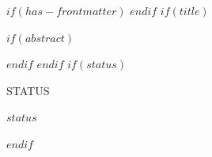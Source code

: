 $if(has-frontmatter)$
\frontmatter
$endif$
$if(title)$
\maketitle
$if(abstract)$
\begin{abstract}
$abstract$
\end{abstract}
$endif$
$endif$
$if(status)$
\par\vspace{0.7em}
\noindent{\color{axiomaccent}\rule{\linewidth}{0.5pt}}\par
\vspace{0.4em}
{\axiommono\fontsize{7}{9}\selectfont STATUS\par}
\vspace{0.25em}
\begingroup\small\sffamily
$status$
\par\endgroup
\vspace{0.9em}
$endif$
